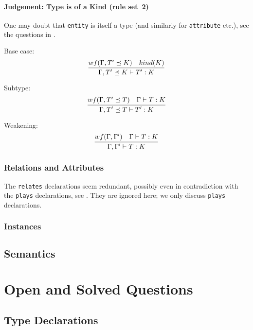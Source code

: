 \documentclass[runningheads]{llncs}
\begin{document}
\paragraph{Judgement: Type is of a Kind (rule set~2)}

One may doubt that \texttt{entity} is itself a type (and similarly for
\texttt{attribute} etc.), see the questions in
.

Base case:
$$
\infer{\Gamma, T' \preceq K \vdash T' : K}{
  wf(\Gamma, T' \preceq K)  & kind(K)
}
$$

Subtype:
$$
\infer{\Gamma, T' \preceq T \vdash T' : K}{
  wf(\Gamma, T' \preceq T) & \Gamma \vdash T : K 
}
$$

Weakening:
$$
\infer{\Gamma, \Gamma' \vdash T : K}{
  wf(\Gamma, \Gamma')
  & 
  \Gamma \vdash T : K
}
$$


\subsubsection{Relations and Attributes}\label{sec:structure_rels_attribs}

The \texttt{relates} declarations seem redundant, possibly even in
contradiction with the \texttt{plays} declarations, see
. They are ignored here; we only discuss
\texttt{plays} declarations.



\subsubsection{Instances}\label{sec:structure_instances}




\subsection{Semantics}





\section{Open and Solved Questions}\label{sec:questions}

\subsection{Type Declarations}\label{sec:questions_type_decls}
\end{document}
